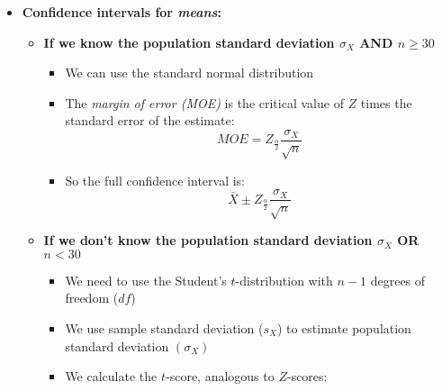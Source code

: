 \documentclass{article}
\begin{document}
\begin{itemize}
\begin{itemize}
\begin{figure}[h!]
	\end{figure}
	\end{itemize}
	\item \textbf{Confidence intervals for \emph{means}:}
	\begin{itemize}
		\item \textbf{If we know the population standard deviation $\sigma_X$ AND $n\geq 30$}
	\begin{itemize}
		\item We can use the standard normal distribution 
		\item The \emph{margin of error (MOE)} is the critical value of $Z$ times the standard error of the estimate: 
		\begin{equation*}
			MOE=Z_{\frac{\alpha}{2}}\frac{\sigma_X}{\sqrt{n}}	
		\end{equation*}
		\item So the full confidence interval is: 
			\begin{equation*}
			\bar{X} \pm Z_{\frac{\alpha}{2}}\frac{\sigma_X}{\sqrt{n}}	
			\end{equation*}
	\end{itemize} 
	\item \textbf{If we don't know the population standard deviation $\sigma_X$ OR $n<30$}
	\begin{itemize}
		\item We need to use the Student's $t$-distribution with $n-1$ degrees of freedom ($df$)
		\item We use sample standard deviation ($s_X$) to estimate population standard deviation $(\sigma_X)$ 
		\item We calculate the $t$-score, analogous to $Z$-scores: 

\end{itemize}
\end{itemize}
\end{itemize}
\end{document}
